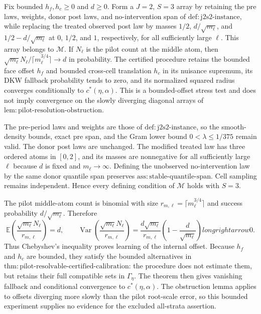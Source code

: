 Fix bounded \(h_f,h_c\geq0\) and \(d\geq0\).  Form a \(J=2\), \(S=3\) array by retaining the pre laws, weights, donor post laws, and no-intervention span of \(\mathrm{def:j2s2\mbox{-}instance}\), while replacing the treated observed post law by masses \(1/2\), \(d/\sqrt{m_\ell}\), and \(1/2-d/\sqrt{m_\ell}\) at \(0\), \(1/2\), and \(1\), respectively, for all sufficiently large \(\ell\).  This array belongs to \(\mathcal M\).  If \(N_\ell\) is the pilot count at the middle atom, then \(\sqrt{m_\ell}N_\ell/\lceil m_\ell^{3/4}\rceil\to d\) in probability.  The certified procedure retains the bounded face offset \(h_f\) and bounded cross-cell translation \(h_c\) in its nuisance supremum, its DKW fallback probability tends to zero, and its normalized squared radius converges conditionally to \(c^*(\eta,\alpha)\).  This is a bounded-offset stress test and does not imply convergence on the slowly diverging diagonal arrays of \(\mathrm{lem:pilot\mbox{-}resolution\mbox{-}obstruction}\).

The pre-period laws and weights are those of \(\mathrm{def:j2s2\mbox{-}instance}\), so the smooth-density bounds, exact pre span, and the Gram lower bound \(0<\lambda\leq1/375\) remain valid.  The donor post laws are unchanged.  The modified treated law has three ordered atoms in \([0,2]\), and its masses are nonnegative for all sufficiently large \(\ell\) because \(d\) is fixed and \(m_\ell\to\infty\).  Defining the unobserved no-intervention law by the same donor quantile span preserves \(\mathrm{ass:stable\mbox{-}quantile\mbox{-}span}\).  Cell sampling remains independent.  Hence every defining condition of \(\mathcal M\) holds with \(S=3\).

The pilot middle-atom count is binomial with size
\(r_{m,\ell}=\lceil m_\ell^{3/4}\rceil\) and success probability \(d/\sqrt{m_\ell}\).  Therefore
\[
 \mathbb E\left(\frac{\sqrt{m_\ell}N_\ell}{r_{m,\ell}}\right)=d,
 \qquad
 \operatorname{Var}\left(\frac{\sqrt{m_\ell}N_\ell}{r_{m,\ell}}\right)
 =\frac{d\sqrt{m_\ell}}{r_{m,\ell}}
   \left(1-\frac d{\sqrt{m_\ell}}\right)longrightarrow0.
\]
Thus Chebyshev's inequality proves learning of the internal offset.  Because \(h_f\) and \(h_c\) are bounded, they satisfy the bounded alternatives in
\(\mathrm{thm:pilot\mbox{-}resolvable\mbox{-}certified\mbox{-}calibration}\): the procedure does not estimate them, but retains their full compatible sets in \(\Gamma_\eta\).  The theorem then gives vanishing fallback and conditional convergence to \(c^*(\eta,\alpha)\).  The obstruction lemma applies to offsets diverging more slowly than the pilot root-scale error, so this bounded experiment supplies no evidence for the excluded all-strata assertion.


